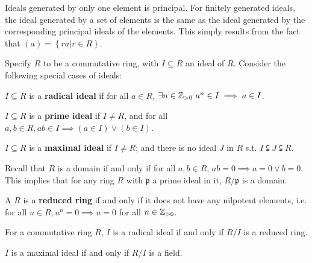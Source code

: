 \vspace{1em}
\begin{remark}
    Ideals generated by only one element is principal. For finitely generated ideals, the ideal generated by a set of elements is the same as the ideal generated by the corresponding principal ideals of the elements. This simply results from the fact that $(a) = \left\{ ra | r\in R \right\}$.
\end{remark}

Specify $R$ to be a commutative ring, with $I \subseteq R$ an ideal of $R$. Consider the following special cases of ideals:

\begin{definition}
    $I \subseteq R$ is a \textbf{radical ideal} if for all $a\in R$, $\exists n\in \mathbb{Z}_{>0}\ a^n\in I \implies a\in I$.
\end{definition}

\begin{definition}
    $I \subseteq R$ is a \textbf{prime ideal} if $I \neq R$, and for all $a, b\in R, ab\in I \implies (a\in I) \vee (b\in I)$.
\end{definition}

\begin{definition}
    $I \subseteq R$ is a \textbf{maximal ideal} if $I \neq R$; and there is no ideal $J$ in $R$ s.t. $I \subsetneqq J \subsetneqq R$. 
\end{definition}

\begin{remark}
    Recall that $R$ is a domain if and only if for all $a, b\in R$, $ab = 0 \implies a = 0 \vee b = 0$. This implies that for any ring $R$ with $\mathfrak{p}$ a prime ideal in it, $R/\mathfrak{p}$ is a domain. 
\end{remark}

\begin{definition}
    A $R$ is a \textbf{reduced ring} if and only if it does not have any nilpotent elements, i.e. for all $u\in R, u^n = 0 \implies u = 0$ for all $n\in \mathbb{Z}_{>0}$.
\end{definition}

\begin{remark}
    For a commutative ring $R$, $I$ is a radical ideal if and only if $R/I$ is a reduced ring.
\end{remark}

\begin{proposition}
    $I$ is a maximal ideal if and only if $R/I$ is a field. 
\end{proposition}

